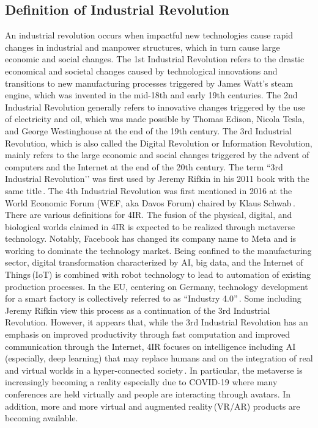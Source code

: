 \documentclass[11pt]{article}
\begin{document}
\subsection{Definition of Industrial Revolution}
An industrial revolution occurs when impactful new technologies cause rapid changes in industrial and manpower structures, which in turn cause large economic and social changes. The 1st Industrial Revolution refers to the drastic economical and societal changes caused by technological innovations and transitions to new manufacturing processes triggered by James Watt’s steam engine, which was invented in the mid-18th and early 19th centuries. The 2nd Industrial Revolution generally refers to innovative changes triggered by the use of electricity and oil, which was made possible by Thomas Edison, Nicola Tesla, and George Westinghouse at the end of the 19th century. The 3rd Industrial Revolution, which is also called the Digital Revolution or Information Revolution, mainly refers to the large economic and social changes triggered by the advent of computers and the Internet at the end of the 20th century. The term ``3rd Industrial Revolution’’ was first used by Jeremy Rifkin in his 2011 book with the same title\,\cite{Rifkin2011}. The 4th Industrial Revolution was first mentioned in 2016 at the World Economic Forum (WEF, aka Davos Forum) chaired by Klaus Schwab\,\cite{Schwab2016}. There are various definitions for 4IR. 
The fusion of the physical, digital, and biological worlds claimed in 4IR is expected to be realized through metaverse technology.
Notably, Facebook has changed its company name to Meta and is working to dominate the technology market. Being confined to the manufacturing sector, digital transformation characterized by AI, big data, and the Internet of Things\,(IoT) is combined with robot technology to lead to automation of existing production processes. In the EU, centering on Germany, technology development for a smart factory is collectively referred to as ``Industry 4.0''\,\cite{lasi2014industry}.
Some including Jeremy Rifkin view this process as a continuation of the 3rd Industrial Revolution. However, it appears that, while the 3rd Industrial Revolution has an emphasis on improved productivity through fast computation and improved communication through the Internet, 4IR focuses on intelligence including AI (especially, deep learning) that may replace humans and on the integration of %
real and virtual worlds in a hyper-connected society\,\cite{Schwab2016b}. In particular, the metaverse is increasingly becoming a reality especially due to COVID-19 where many conferences are held virtually and people are interacting through avatars. In addition, more and more virtual and augmented reality\,(VR/AR) products are becoming available.
\end{document}
